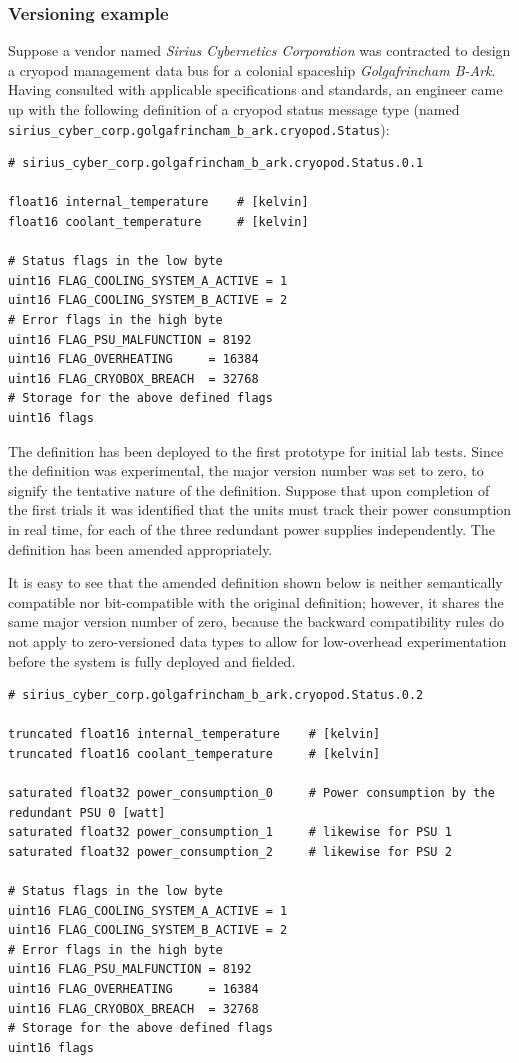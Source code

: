 \subsubsection{Versioning example}

Suppose a vendor named \emph{Sirius Cybernetics Corporation} was contracted to design a
cryopod management data bus for a colonial spaceship \emph{Golgafrincham B-Ark}.
Having consulted with applicable specifications and standards, an engineer came up with the following
definition of a cryopod status message type (named \verb|sirius_cyber_corp.golgafrincham_b_ark.cryopod.Status|):

\begin{verbatim}
# sirius_cyber_corp.golgafrincham_b_ark.cryopod.Status.0.1

float16 internal_temperature    # [kelvin]
float16 coolant_temperature     # [kelvin]

# Status flags in the low byte
uint16 FLAG_COOLING_SYSTEM_A_ACTIVE = 1
uint16 FLAG_COOLING_SYSTEM_B_ACTIVE = 2
# Error flags in the high byte
uint16 FLAG_PSU_MALFUNCTION = 8192
uint16 FLAG_OVERHEATING     = 16384
uint16 FLAG_CRYOBOX_BREACH  = 32768
# Storage for the above defined flags
uint16 flags
\end{verbatim}

The definition has been deployed to the first prototype for initial lab tests.
Since the definition was experimental, the major version number was set to zero, to signify the
tentative nature of the definition.
Suppose that upon completion of the first trials it was identified that the units must track their power consumption
in real time, for each of the three redundant power supplies independently.
The definition has been amended appropriately.

It is easy to see that the amended definition shown below is neither semantically compatible nor bit-compatible
with the original definition; however, it shares the same major version number of zero, because the backward
compatibility rules do not apply to zero-versioned data types to allow for low-overhead experimentation
before the system is fully deployed and fielded.

\begin{verbatim}
# sirius_cyber_corp.golgafrincham_b_ark.cryopod.Status.0.2

truncated float16 internal_temperature    # [kelvin]
truncated float16 coolant_temperature     # [kelvin]

saturated float32 power_consumption_0     # Power consumption by the redundant PSU 0 [watt]
saturated float32 power_consumption_1     # likewise for PSU 1
saturated float32 power_consumption_2     # likewise for PSU 2

# Status flags in the low byte
uint16 FLAG_COOLING_SYSTEM_A_ACTIVE = 1
uint16 FLAG_COOLING_SYSTEM_B_ACTIVE = 2
# Error flags in the high byte
uint16 FLAG_PSU_MALFUNCTION = 8192
uint16 FLAG_OVERHEATING     = 16384
uint16 FLAG_CRYOBOX_BREACH  = 32768
# Storage for the above defined flags
uint16 flags
\end{verbatim}

